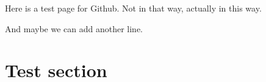 \documentclass{article}
\begin{document}
Here is a test page for Github. Not in that way, actually in this way.

And maybe we can add another line.

\section{Test section}
\end{document}
